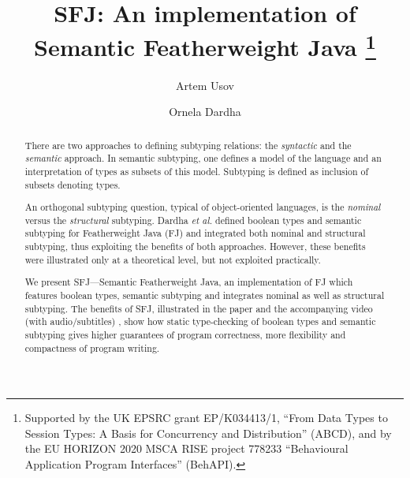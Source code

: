 \documentclass[runningheads]{llncs}
\begin{document}
\title{SFJ: An implementation of Semantic Featherweight Java
    \thanks{Supported by the UK EPSRC grant EP/K034413/1, ``From Data Types to Session Types: A Basis for Concurrency and Distribution'' (ABCD), and by the EU HORIZON 2020 MSCA RISE project 778233
    ``Behavioural Application Program Interfaces'' (BehAPI).}
}

\author{Artem Usov \and Ornela Dardha}


\maketitle

\begin{abstract}
    There are two approaches to defining subtyping relations: the \emph{syntactic} and the \emph{semantic} approach.
    In semantic subtyping, one defines a model of the language and an interpretation of types as subsets of this model.
    Subtyping is defined as inclusion of subsets denoting types.

    An orthogonal subtyping question, typical of object-oriented languages, is the \emph{nominal} versus the \emph{structural} subtyping.
    Dardha \emph{et al.} \cite{Dardha2013,Dardha2017} defined boolean types and semantic subtyping for Featherweight Java (FJ) and integrated both nominal and structural subtyping, thus exploiting the benefits of both approaches.
    However, these benefits were illustrated only at a theoretical level, but not exploited practically.

    We present SFJ---Semantic Featherweight Java, an implementation of FJ which features boolean types, semantic subtyping and integrates nominal as well as structural subtyping.
    The benefits of SFJ, illustrated in the paper and the accompanying video (with audio/subtitles) \cite{UD20}, show how static type-checking of boolean types and semantic subtyping gives higher guarantees of program correctness, more flexibility and compactness of program writing.
\end{abstract}
\end{document}
